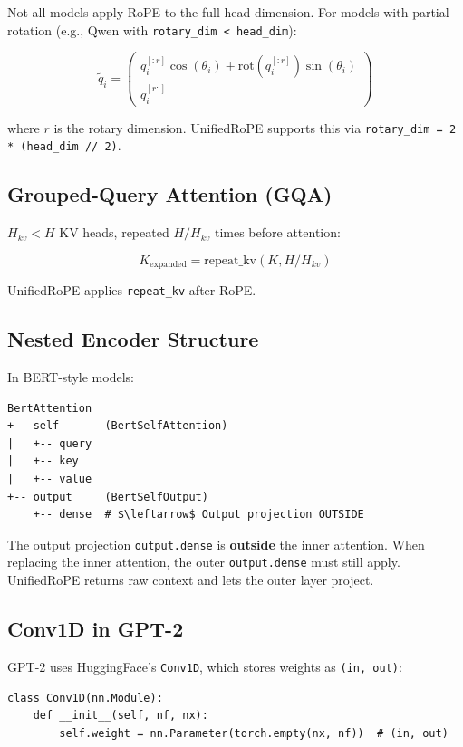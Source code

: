 {Not all models apply RoPE to the full head dimension. For models with 
partial rotation (e.g., Qwen with \texttt{rotary\_dim < head\_dim}):

\[
\tilde{q}_i = \begin{pmatrix} q_i^{[:r]} \cos(\theta_i) + \mathrm{rot}(q_i^{[:r]}) \sin(\theta_i) \\ q_i^{[r:]} \end{pmatrix}
\tag{3.6}
\]

where $r$ is the rotary dimension. UnifiedRoPE supports this via 
\texttt{rotary\_dim = 2 * (head\_dim // 2)}.

\subsection{Grouped-Query Attention (GQA)}

$H_{kv} < H$ KV heads, repeated $H / H_{kv}$ times before attention:

\[
K_\text{expanded} = \mathrm{repeat\_kv}(K, H / H_{kv})
\tag{3.7}
\]

UnifiedRoPE applies \texttt{repeat\_kv} after RoPE.

\subsection{Nested Encoder Structure}

In BERT-style models:

\begin{lstlisting}
BertAttention
+-- self       (BertSelfAttention)
|   +-- query
|   +-- key
|   +-- value
+-- output     (BertSelfOutput)
    +-- dense  # $\leftarrow$ Output projection OUTSIDE
\end{lstlisting}

The output projection \texttt{output.dense} is \textbf{outside} the inner attention. 
When replacing the inner attention, the outer \texttt{output.dense} must still 
apply. UnifiedRoPE returns raw context and lets the outer layer project.

\subsection{Conv1D in GPT-2}

GPT-2 uses HuggingFace's \texttt{Conv1D}, which stores weights as \texttt{(in, out)}:

\begin{lstlisting}
class Conv1D(nn.Module):
    def __init__(self, nf, nx):
        self.weight = nn.Parameter(torch.empty(nx, nf))  # (in, out)
\end{lstlisting}

}
